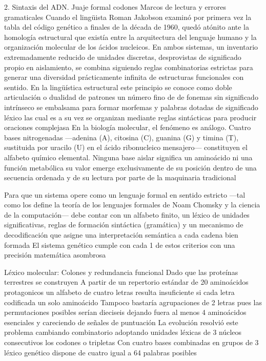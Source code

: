 2. Sintaxis del ADN. Juaje formal codones Marcos de lectura y errores gramaticales
Cuando el lingüista Roman Jakobson examinó por primera vez la tabla del código genético a finales de la década de 1960, quedó atónito ante la homología estructural que existía entre la arquitectura del lenguaje humano y la organización molecular de los ácidos nucleicos. 
En ambos sistemas, un inventario extremadamente reducido de unidades discretas, desprovistas de significado propio en aislamiento, se combina siguiendo reglas combinatorias estrictas para generar una diversidad prácticamente infinita de estructuras funcionales con sentido. 
En la lingüística estructural este principio se conoce como doble articulación o dualidad de patrones un número fino de de fonemas sin significado intrínseco se embalsama para formar morfemas y palabras dotadas de significado léxico las cual es a su vez se organizan mediante reglas sintácticas para producir oraciones complejasa
En la biología molecular, el fenómeno es análogo. Cuatro bases nitrogenadas —adenina (A), citosina (C), guanina (G) y timina (T), sustituida por uracilo (U) en el ácido ribonucleico mensajero— constituyen el alfabeto químico elemental.
Ninguna base aislar significa un aminoácido ni una función metabólica su valor emerge exclusivamente de su posición dentro de una secuencia ordenada y de su lectura por parte de la maquinaria tradicional 

Para que un sistema opere como un lenguaje formal en sentido estricto —tal como los define la teoría de los lenguajes formales de Noam Chomsky y la ciencia de la computación— debe contar con un alfabeto finito, un léxico de unidades significativas, reglas de formación sintáctica (gramática) y un mecanismo de decodificación que asigne una interpretación semántica a cada cadena bien formada
El sistema genético cumple con cada 1 de estos criterios con una precisión matemática asombrosa

Léxico molecular: Colones y redundancia funcional
Dado que las proteínas terrestres se construyen A partir de un repertorio estándar de 20 aminoácidos protagonicos un alfabeto de cuatro letras resulta insuficiente si cada letra codificada un solo aminoácido
Tampoco bastaría agrupaciones de 2 letras pues las permutaciones posibles serían dieciseis dejando fuera al menos 4 aminoácidos esenciales y careciendo de señales de puntuación
La evolución resolvió este problema cambiando combinatorio adoptando unidades léxicas de 3 núcleos consecutivos los codones o tripletas
Con cuatro bases combinadas en grupos de 3 léxico genético dispone de cuatro igual a 64 palabras posibles 

